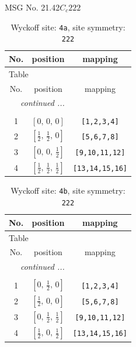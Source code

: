 \documentclass[fleqn,8pt]{jsarticle}
\begin{document}
\setcounter{MaxMatrixCols}{32}

\renewcommand{\tablename}{Table~}
\renewcommand{\figurename}{Figure~}
\begin{center}
\LARGE
MSG No. 21.42\quad$C_{c}222$
\end{center}
\renewcommand{\arraystretch}{1.2}
\begin{longtable}{ccc}
\caption{Wyckoff site: {\tt 4a}, site symmetry: {\tt 222}}
 \\
 \hline \hline
No. & position & mapping \\ \hline \endfirsthead

\multicolumn{2}{l}{\tablename\ \thetable{}} \\
 \hline \hline
No. & position & mapping \\ \hline \endhead

 \hline \hline
\multicolumn{2}{r}{\footnotesize\it continued ...} \\ \endfoot

 \hline \hline
\multicolumn{2}{r}{} \\ \endlastfoot

1 & $\left[ 0,\, 0,\, 0 \right]$ & {\tt [1,2,3,4]} \\ \hline
2 & $\left[ \frac{1}{2},\, \frac{1}{2},\, 0 \right]$ & {\tt [5,6,7,8]} \\ \hline
3 & $\left[ 0,\, 0,\, \frac{1}{2} \right]$ & {\tt [9,10,11,12]} \\ \hline
4 & $\left[ \frac{1}{2},\, \frac{1}{2},\, \frac{1}{2} \right]$ & {\tt [13,14,15,16]} \\
\end{longtable}
\renewcommand{\arraystretch}{1.2}
\begin{longtable}{ccc}
\caption{Wyckoff site: {\tt 4b}, site symmetry: {\tt 222}}
 \\
 \hline \hline
No. & position & mapping \\ \hline \endfirsthead

\multicolumn{2}{l}{\tablename\ \thetable{}} \\
 \hline \hline
No. & position & mapping \\ \hline \endhead

 \hline \hline
\multicolumn{2}{r}{\footnotesize\it continued ...} \\ \endfoot

 \hline \hline
\multicolumn{2}{r}{} \\ \endlastfoot

1 & $\left[ 0,\, \frac{1}{2},\, 0 \right]$ & {\tt [1,2,3,4]} \\ \hline
2 & $\left[ \frac{1}{2},\, 0,\, 0 \right]$ & {\tt [5,6,7,8]} \\ \hline
3 & $\left[ 0,\, \frac{1}{2},\, \frac{1}{2} \right]$ & {\tt [9,10,11,12]} \\ \hline
4 & $\left[ \frac{1}{2},\, 0,\, \frac{1}{2} \right]$ & {\tt [13,14,15,16]} \\
\end{longtable}
\end{document}
